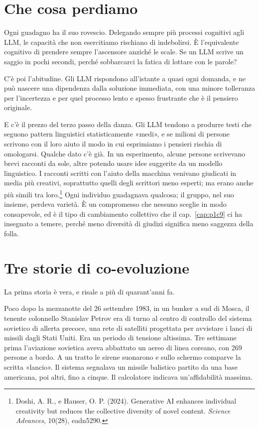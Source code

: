 \section{Che cosa perdiamo}
\label{sec:p3c23-svantaggi}

Ogni guadagno ha il suo rovescio. Delegando sempre più processi cognitivi agli LLM, le capacità che non esercitiamo rischiano di indebolirsi. È l'equivalente cognitivo di prendere sempre l'ascensore anziché le scale. Se un LLM scrive un saggio in pochi secondi, perché sobbarcarci la fatica di lottare con le parole?

C'è poi l'abitudine. Gli LLM rispondono all'istante a quasi ogni domanda, e ne può nascere una dipendenza dalla soluzione immediata, con una minore tolleranza per l'incertezza e per quel processo lento e spesso frustrante che è il pensiero originale.

E c'è il prezzo del terzo passo della danza. Gli LLM tendono a produrre testi che seguono pattern linguistici statisticamente «medi», e se milioni di persone scrivono con il loro aiuto il modo in cui esprimiamo i pensieri rischia di omologarsi. Qualche dato c'è già. In un esperimento, alcune persone scrivevano brevi racconti da sole, altre potendo usare idee suggerite da un modello linguistico. I racconti scritti con l'aiuto della macchina venivano giudicati in media più creativi, soprattutto quelli degli scrittori meno esperti; ma erano anche più simili tra loro.\footnote{Doshi, A. R., e Hauser, O. P. (2024). Generative AI enhances individual creativity but reduces the collective diversity of novel content. \textit{Science Advances}, 10(28), eadn5290.} Ogni individuo guadagnava qualcosa; il gruppo, nel suo insieme, perdeva varietà. È un compromesso che nessuno sceglie in modo consapevole, ed è il tipo di cambiamento collettivo che il cap.~\ref{cap:p1c9} ci ha insegnato a temere, perché meno diversità di giudizi significa meno saggezza della folla.

\section{Tre storie di co-evoluzione}

La prima storia è vera, e risale a più di quarant'anni fa.

Poco dopo la mezzanotte del 26 settembre 1983, in un bunker a sud di Mosca, il tenente colonnello Stanislav Petrov era di turno al centro di controllo del sistema sovietico di allerta precoce, una rete di satelliti progettata per avvistare i lanci di missili dagli Stati Uniti. Era un periodo di tensione altissima. Tre settimane prima l'aviazione sovietica aveva abbattuto un aereo di linea coreano, con 269 persone a bordo. A un tratto le sirene suonarono e sullo schermo comparve la scritta «lancio». Il sistema segnalava un missile balistico partito da una base americana, poi altri, fino a cinque. Il calcolatore indicava un'affidabilità massima.

